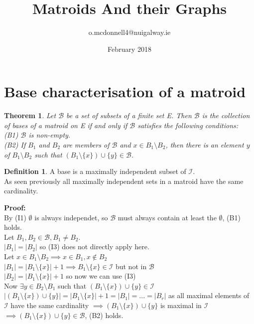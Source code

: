 \documentclass{article}
\title{Matroids And their Graphs}
\author{o.mcdonnell4@nuigalway.ie }
\date{February 2018}
\theoremstyle{plain}
\newtheorem{thm}{Theorem}[section]
\theoremstyle{definition}
\newtheorem{defn}{Definition}[section]
\theoremstyle{remark}
\newcommand\Proof{%
    \textbf{Proof:}~%
}
\begin{document}
\maketitle
 
 \section{Base characterisation of a matroid}
 
 \begin{thm}
 Let $\mathcal{B}$ be a set of subsets of a finite set E. Then $\mathcal{B}$ is the collection of bases of a matroid on E if and only if $\mathcal{B}$ satisfies the following conditions:\\
 (B1) $\mathcal{B}$ is non-empty.\\
 (B2) If $B_1$ and $B_2$ are members of $\mathcal{B}$ and $x \in B_1 \setminus B_2$, then there is an element $y$ of $B_1 \setminus B_2$ such that $(B_1 \setminus \{x\}) \cup \{y\} \in \mathcal{B}$.
 \end{thm}
 
\begin{defn}
A base is a maximally independent subset of $\mathcal{I}.$\\
\noindent As seen previously all maximally independent sets in a matroid have the same cardinality.
\end{defn}

\noindent \Proof \\
\noindent By (I1) $\emptyset$ is always independet, so $\mathcal{B}$ must always contain at least the $\emptyset$, (B1) holds.\\
\noindent Let $B_1 ,B_2 \in \mathcal{B}, B_1 \neq B_2.$ \\
\noindent $|B_1| = |B_2|$ so (I3) does not directly apply here.\\
\noindent Let $x \in B_1 \setminus B_2 \implies x \in B_1, x \notin B_2$\\
\noindent $|B_1| = |B_1 \setminus \{x\}| + 1 \implies B_1 \setminus \{x\} \in \mathcal{I}$ but not in $\mathcal{B}$\\
\noindent $|B_2| = |B_1 \setminus \{x\}| + 1$ so now we can use (I3)\\
\noindent Now $\exists y \in B_2 \setminus B_1$ such that $(B_1 \setminus \{x\}) \cup \{y\} \in \mathcal{I}$\\
$|(B_1 \setminus \{x\}) \cup \{y\}| = |B_1 \setminus \{x\}| + 1 = |B_1| = ... = |B_r|$ as all maximal elements of $\mathcal{I}$ have the same cardinality $\implies (B_1 \setminus \{x\}) \cup \{y\}$ is maximal in $\mathcal{I}$\\
$\implies (B_1 \setminus \{x\}) \cup \{y\} \in \mathcal{B}$, (B2) holds.
\end{document}
